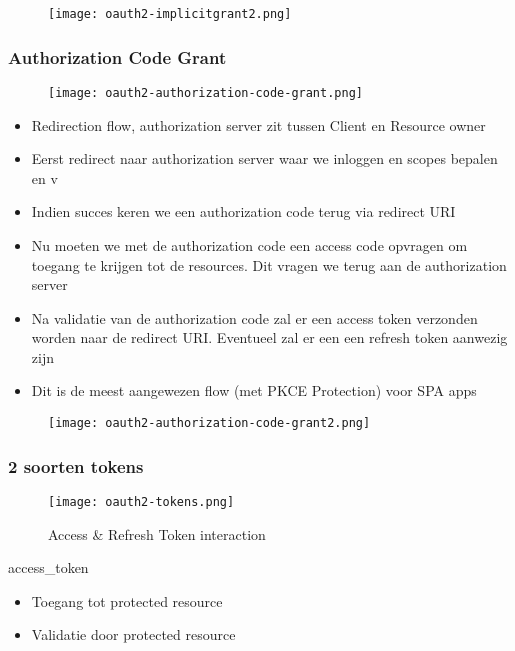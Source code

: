 \documentclass{article}
\begin{document}
\begin{figure}[H]
    \centering
    \texttt{[image: oauth2-implicitgrant2.png]}
    \caption{}
\end{figure}

\subsubsection{Authorization Code Grant}
\begin{figure}[H]
    \centering
    \texttt{[image: oauth2-authorization-code-grant.png]}
\end{figure}


\begin{itemize}
    \item Redirection flow, authorization server zit tussen Client en Resource owner
    \item Eerst redirect naar authorization server waar we inloggen en scopes bepalen en v
    \item Indien succes keren we een authorization code terug via redirect URI
    \item Nu moeten we met de authorization code een access code opvragen om toegang te krijgen tot de resources. Dit vragen we terug aan de authorization server
    \item Na validatie van de authorization code zal er een access token verzonden worden naar de redirect URI. Eventueel zal er een een refresh token aanwezig zijn
    \item Dit is de meest aangewezen flow (met PKCE Protection) voor SPA apps
\end{itemize}

\begin{figure}[H]
    \centering
    \texttt{[image: oauth2-authorization-code-grant2.png]}
    \caption{}
\end{figure}

\subsubsection{2 soorten tokens}

\begin{figure}[H]
    \centering
    \texttt{[image: oauth2-tokens.png]}
    \caption{Access \& Refresh Token interaction}
\end{figure}

access\_token

\begin{itemize}
    \item Toegang tot protected resource
    \item Validatie door protected resource
\end{itemize}
\end{document}

